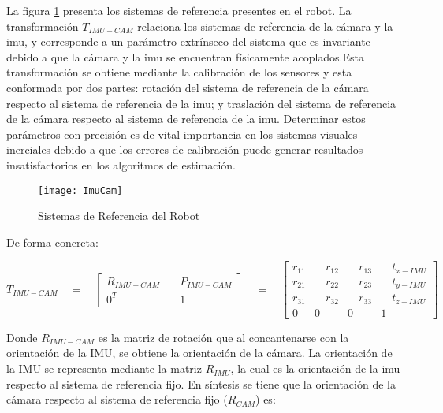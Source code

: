 La figura \ref{fig:TransformacionesRobot} presenta los sistemas de referencia presentes en el robot. La transformación ${T}_{IMU-CAM}$ relaciona los sistemas de referencia de la cámara y la imu, y corresponde a un parámetro extrínseco del sistema que es invariante debido a que la cámara y la imu se encuentran físicamente acoplados.Esta transformación se obtiene mediante la calibración de los sensores y esta conformada por dos partes: rotación del sistema de referencia de la cámara respecto al sistema de referencia de la imu; y traslación del sistema de referencia de la cámara respecto al sistema de referencia de la imu. Determinar estos parámetros con precisión es de vital importancia en los sistemas visuales-inerciales debido a que los errores de calibración puede generar resultados insatisfactorios en los algoritmos de estimación.



\begin{figure}[H]
	\centering
	\texttt{[image: ImuCam]}
	\caption{Sistemas de Referencia del Robot }
	\label{fig:TransformacionesRobot}
\end{figure}


De forma concreta:

\begin{equation}
{ { T } }_{ IMU -CAM }\quad =\quad \begin{bmatrix} R_{ IMU - CAM } & \quad { { P } }_{ IMU - CAM } \\ { 0 }^{ T } & \quad 1 \end{bmatrix}\quad =\quad \begin{bmatrix} { r }_{ 11 } & { \quad r }_{ 12 } & { \quad r }_{ 13 } & \quad t_{ x-IMU } \\ { r }_{ 21 } & { \quad r }_{ 22 } & { \quad r }_{ 23 } & { \quad t }_{ y-IMU } \\ { r }_{ 31 } & { \quad r }_{ 32 } & { \quad r }_{ 33 } & \quad { t }_{ z-IMU } \\ 0 & 0 & 0 & 1 \end{bmatrix}\quad 
\label{eq:transformacionIMUCAM} 
\end{equation}

Donde ${R}_{IMU-CAM}$ es la matriz de rotación que al concantenarse con la orientación de la IMU, se obtiene la orientación de la cámara. La orientación de la IMU se representa mediante la matriz ${R}_{IMU}$, la cual es la orientación de la imu respecto al sistema de referencia fijo. En síntesis se tiene que la orientación de la cámara respecto al sistema de referencia fijo (${R}_{CAM}$) es:

